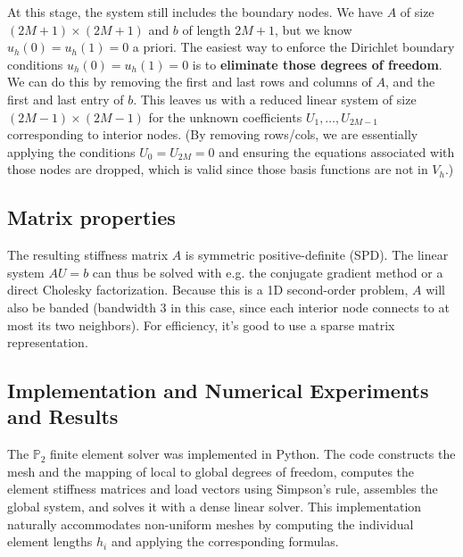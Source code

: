 \documentclass[a4paper,10pt]{article}
\begin{document}
At this stage, the system still includes the boundary nodes. We have \(A\) of size \((2M+1)\times(2M+1)\) and \(b\) of length \(2M+1\), but we know \(u_h(0)=u_h(1)=0\) a priori. 
The easiest way to enforce the Dirichlet boundary conditions \(u_h(0)=u_h(1)=0\) is to \textbf{eliminate those degrees of freedom}. 
We can do this by removing the first and last rows and columns of \(A\), and the first and last entry of \(b\).
This leaves us with a reduced linear system of size \((2M-1)\times(2M-1)\) for the unknown coefficients \(U_1,\dots,U_{2M-1}\) corresponding to interior nodes. (By removing rows/cols, we are essentially applying the conditions \(U_0=U_{2M}=0\) and ensuring the equations associated with those nodes are dropped, which is valid since those basis functions are not in \(V_h\).)

\subsection*{Matrix properties}
The resulting stiffness matrix \(A\) is symmetric positive-definite (SPD). 
The linear system \(A U = b\) can thus be solved with e.g. the conjugate gradient method or a direct Cholesky factorization. 
Because this is a 1D second-order problem, \(A\) will also be banded (bandwidth 3 in this case, since each interior node connects to at most its two neighbors). 
For efficiency, it's good to use a sparse matrix representation.

\subsection{Implementation and Numerical Experiments and Results}

The \(\mathbb{P}_2\) finite element solver was implemented in Python. The code constructs the mesh and the mapping of local to global degrees of freedom, computes the element stiffness matrices and load vectors using Simpson's rule, assembles the global system, and solves it with a dense linear solver. This implementation naturally accommodates non-uniform meshes by computing the individual element lengths \(h_i\) and applying the corresponding formulas.
\end{document}
